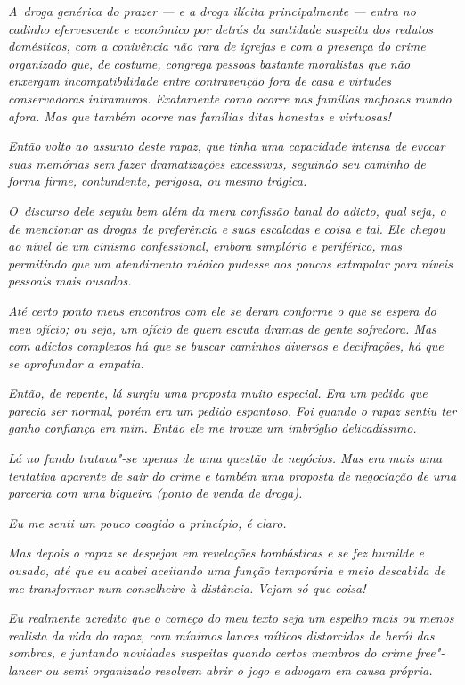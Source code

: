 \emph{A~droga genérica do prazer --- e a droga ilícita principalmente
--- entra no cadinho efervescente e econômico por detrás da santidade
suspeita dos redutos domésticos, com a conivência não rara de igrejas e
com a presença do crime organizado que, de costume, congrega pessoas
bastante moralistas que não enxergam incompatibilidade entre
contravenção fora de casa e virtudes conservadoras intramuros.
Exatamente como ocorre nas famílias mafiosas mundo afora. Mas que também
ocorre nas famílias ditas honestas e virtuosas!}

\emph{Então volto ao assunto deste rapaz, que tinha uma capacidade
intensa de evocar suas memórias sem fazer dramatizações excessivas,
seguindo seu caminho de forma firme, contundente, perigosa, ou mesmo
trágica.}~

\emph{O~discurso dele seguiu bem além da mera confissão banal do adicto,
qual seja, o de mencionar as drogas de preferência e suas escaladas e
coisa e tal. Ele chegou ao nível de um cinismo confessional, embora
simplório e periférico, mas permitindo que um atendimento médico pudesse
aos poucos extrapolar para níveis pessoais mais ousados.}~

\emph{Até certo ponto meus encontros com ele se deram conforme o que se
espera do meu ofício; ou seja, um ofício de quem escuta dramas de gente
sofredora. Mas com adictos complexos há que se buscar caminhos diversos
e decifrações, há que se aprofundar a empatia.}~

\emph{Então, de repente, lá surgiu uma proposta muito especial. Era um
pedido que parecia ser normal, porém era um pedido espantoso. Foi quando
o rapaz sentiu ter ganho confiança em mim. Então ele me trouxe um
imbróglio delicadíssimo.}~

\emph{Lá no fundo tratava"-se apenas de uma questão de negócios. Mas era
mais uma tentativa aparente de sair do crime e também uma proposta de
negociação de uma parceria com uma biqueira (ponto de venda de droga).}~

\emph{Eu me senti um pouco coagido a princípio, é claro.}~

\emph{Mas depois o rapaz se despejou em revelações bombásticas e se fez
humilde e ousado, até que eu acabei aceitando uma função temporária e
meio descabida de me transformar num conselheiro à distância. Vejam só
que coisa!}

\emph{Eu realmente acredito que o começo do meu texto seja um espelho
mais ou menos realista da vida do rapaz, com mínimos lances míticos
distorcidos de herói das sombras, e juntando novidades suspeitas quando
certos membros do crime free"-lancer ou semi organizado resolvem abrir o
jogo e advogam em causa própria.}~


